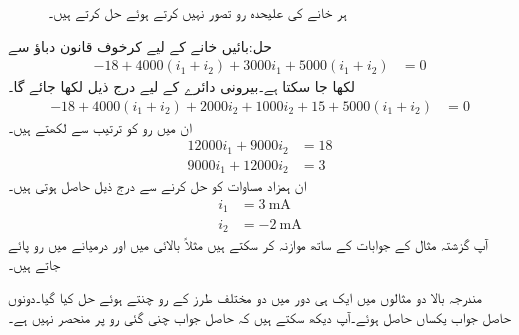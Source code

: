 \begin{figure}
\centering
{}%
\caption{ہر خانے کی علیحدہ رو تصور نہیں کرتے ہوئے حل کرتے ہیں۔}
\label{شکل_جوڑ_رو_دوسری_کو_لپیٹتی_ہے}
\end{figure}%
حل:بائیں خانے کے لیے کرخوف قانون دباؤ سے
\begin{align*}
-18+4000(i_1+i_2)+3000 i_1+5000(i_1+i_2)&=0
\end{align*}
لکھا جا سکتا ہے۔بیرونی دائرے کے لیے درج ذیل لکھا جائے گا۔
\begin{align*}
-18+4000(i_1+i_2)+2000i_2 +1000i_2 +15+5000(i_1+i_2)&=0
\end{align*}
ان میں رو کو ترتیب سے لکھتے ہیں۔
\begin{align*}
12000 i_1+9000 i_2&=18\\
9000i_1+12000i_2&=3
\end{align*}
ان ہمزاد مساوات کو حل کرنے سے درج ذیل حاصل ہوتی ہیں۔
\begin{align*}
i_1&=\SI{3}{\milli\ampere}\\
i_2&=\SI{-2}{\milli\ampere}
\end{align*}
آپ گزشتہ مثال کے جوابات کے ساتھ موازنہ کر سکتے ہیں مثلاً بالائی  میں  اور درمیانے  میں  رو پائے جاتے ہیں۔

مندرجہ بالا دو مثالوں میں ایک ہی دور میں دو مختلف طرز کے رو چنتے ہوئے حل کیا گیا۔دونوں حاصل جواب یکساں حاصل ہوئے۔آپ دیکھ سکتے ہیں کہ حاصل جواب چنی گئی رو پر منحصر نہیں ہے۔

